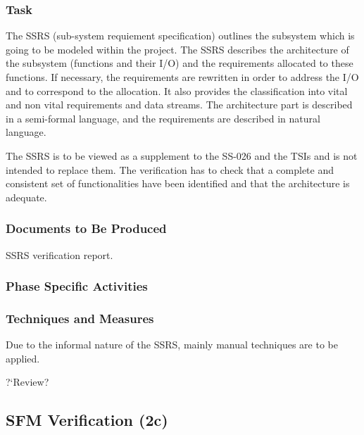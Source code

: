 \documentclass{template/openetcs_report}
\newcommand{\qq}[1]{?`#1?}
\begin{document}
\subsubsection{Task}
\label{sec:ssrs-verif-task}

The SSRS (sub-system requiement specification) outlines the subsystem
which is going to be modeled within the project. The SSRS describes
the architecture of the subsystem (functions and their I/O) and the
requirements allocated to these functions. If necessary, the
requirements are rewritten in order to address the I/O and to
correspond to the allocation. It also provides the classification into
vital and non vital requirements and data
streams. The architecture part is described in a semi-formal language,
and the requirements are described in natural language.

The SSRS is to be viewed as a supplement to the SS-026 and the
TSIs and is not intended to replace them. The verification has to
check that a complete and consistent set of functionalities have been
identified and that the architecture is adequate. 



\subsubsection{Documents to Be Produced}
\label{sec:ssrs-verif-docum-be-prod}

SSRS verification report.

\subsubsection{Phase Specific Activities}
\label{sec:ssrs-verif-phase-spec-activ}

\subsubsection{Techniques and Measures}
\label{sec:ssrs-verif-techniques-measures}

 Due to the informal
nature of the SSRS, mainly manual techniques are to be applied.

\qq{Review}



\subsection{SFM Verification (2c)}
\label{sec:sfm-verif-verification}
\end{document}
